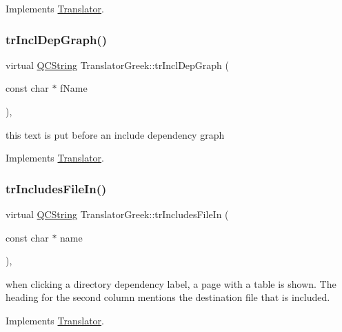 Implements \mbox{\hyperlink{class_translator}{Translator}}.

\mbox{\label{class_translator_greek_a256778bb4bc81bd82287aefc81e1fd2c}} 
\subsubsection{\texorpdfstring{trInclDepGraph()}{trInclDepGraph()}}
{\footnotesize\ttfamily virtual \mbox{\hyperlink{class_q_c_string}{Q\+C\+String}} Translator\+Greek\+::tr\+Incl\+Dep\+Graph (\begin{DoxyParamCaption}\item[{const char $\ast$}]{f\+Name }\end{DoxyParamCaption})\hspace{0.3cm}{\ttfamily [inline]}, {\ttfamily [virtual]}}

this text is put before an include dependency graph 

Implements \mbox{\hyperlink{class_translator}{Translator}}.

\mbox{\label{class_translator_greek_a4b21b094a8626f71fad02cfec6fb243e}} 
\subsubsection{\texorpdfstring{trIncludesFileIn()}{trIncludesFileIn()}}
{\footnotesize\ttfamily virtual \mbox{\hyperlink{class_q_c_string}{Q\+C\+String}} Translator\+Greek\+::tr\+Includes\+File\+In (\begin{DoxyParamCaption}\item[{const char $\ast$}]{name }\end{DoxyParamCaption})\hspace{0.3cm}{\ttfamily [inline]}, {\ttfamily [virtual]}}

when clicking a directory dependency label, a page with a table is shown. The heading for the second column mentions the destination file that is included. 

Implements \mbox{\hyperlink{class_translator}{Translator}}.

\mbox{\label{class_translator_greek_aa70e8195bc5e3a97e754581217f8ce24}} 
